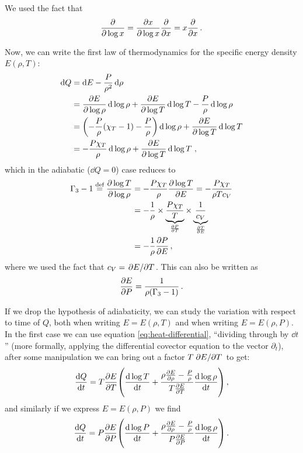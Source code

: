 \documentclass[main.tex]{subfiles}
\begin{document}
We used the fact that 
%
\begin{align}
\pdv{}{\log x} = \pdv{x}{\log x} \pdv{}{x}= x \pdv{}{x} 
\,.
\end{align}

Now, we can write the first law of thermodynamics for the specific energy density \(E(\rho, T)\): 
%
\begin{subequations}
\begin{align}
\dd{Q} &= \dd{E} - \frac{P}{\rho^2} \dd{\rho }  \label{eq:heat-differential}\\
&= \pdv{E}{\log \rho } \dd{\log \rho } 
+ \pdv{E }{\log T} \dd{\log T} - \frac{P}{\rho}  \dd{\log \rho }  \\
&= \qty(- \frac{P}{\rho } \qty(\chi_{T} -1) - \frac{P}{\rho }) \dd{\log \rho } + \pdv{E}{\log T} \dd{\log T}  \\
&= - \frac{P \chi_T }{\rho } \dd{\log \rho } + \pdv{E}{\log T} \dd{\log T} 
\,,
\end{align}
\end{subequations}
%
which in the adiabatic (\(\dd{Q} = 0\)) case reduces to 
%
\begin{subequations}
\begin{align}
\Gamma_3 - 1 \overset{\text{def}}{=} \pdv{\log T }{\log \rho } &= - \frac{P \chi_{T}  }{\rho } \pdv{\log T}{E} = - \frac{P \chi_T }{\rho T c_V}  \\
&=- \frac{1}{\rho } \times \underbrace{\frac{P \chi_T}{T}}_{\pdv{P}{T}} \times \underbrace{\frac{1}{c_V}}_{\pdv{T}{E}}  \\
&= - \frac{1}{\rho } \pdv{P}{E}
\,,
\end{align}
\end{subequations}
%
where we used the fact that \(c_V = \pdv*{E}{T}\). This can also be written as 
%
\begin{align}
\pdv{E}{P} = \frac{1}{\rho (\Gamma_3 -1)}
\,.
\end{align}

If we drop the hypothesis of adiabaticity, we can study the variation with respect to time of \(Q\), both when writing \(E = E(\rho , T)\) and when writing \(E = E(\rho , P)\). 
In the first case we can use equation \eqref{eq:heat-differential}, ``dividing through by \(\dd{t}\)'' (more formally, applying the differential covector equation to the vector \(\partial_{t}\)), after some manipulation we can bring out a factor \(T \pdv*{E}{T}\) to get: 
%
\begin{align} \label{eq:heat-variation-temperature-dependence}
\dv{Q}{t} = T \pdv{E}{T} \qty(\dv{\log T}{t} + \frac{\rho \pdv{E}{\rho } - \frac{P}{\rho }}{T \pdv{E}{T}} \dv{\log \rho }{t})
\,,
\end{align}
%
and similarly if we express \(E = E(\rho, P)\) we find 
%
\begin{align}\label{eq:heat-variation-pressure-dependence}
\dv{Q}{t} = P \pdv{E}{P} \qty(\dv{\log P}{t} + \frac{\rho \pdv{E}{\rho } - \frac{P}{\rho }}{P \pdv{E}{P}} \dv{\log \rho }{t})
\,.
\end{align}
\end{document}
